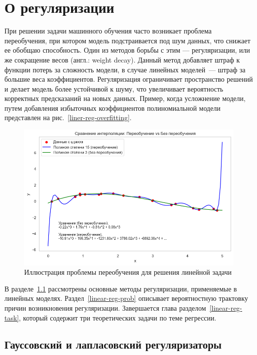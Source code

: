 
\section{О регуляризации}

При решении задачи машинного обучения часто возникает проблема переобучения, при котором модель подстраивается под шум данных, что снижает ее обобщаю способность.
Один из методов борьбы с этим --- регуляризации, или же сокращение весов (англ.: weight decay). Данный метод добавляет штраф к функции потерь за сложность модели, в случае линейных моделей~--- штраф за большие веса коэффициентов. Регуляризация ограничивает пространство решений и делает модель более устойчивой к шуму, что увеличивает вероятность корректных предсказаний на новых данных. Пример, когда усложнение модели, путем добавления избыточных коэффициентов полиномиальной модели представлен на рис.~\ref{liner-reg-overfitting}.

\begin{figure}[h]
	\centering
	\includegraphics[width=0.9\linewidth]{chapters/linear/pics/reg-overfitting.png}
	\caption{Иллюстрация проблемы переобучения для решения линейной задачи}
	\label{linear-reg-overfitting}
\end{figure}

В разделе~\ref{linear-reg-l1l2} рассмотрены основные методы регуляризации, применяемые в линейных моделях. Раздел~\ref{linear-reg-prob} описывает вероятностную трактовку причин возникновения регуляризации. Завершается глава разделом~\ref{linear-reg-task}, который содержит три теоретических задачи по теме регрессии.

\subsection{Гауссовский и лапласовский регуляризаторы}
\label{linear-reg-l1l2}


